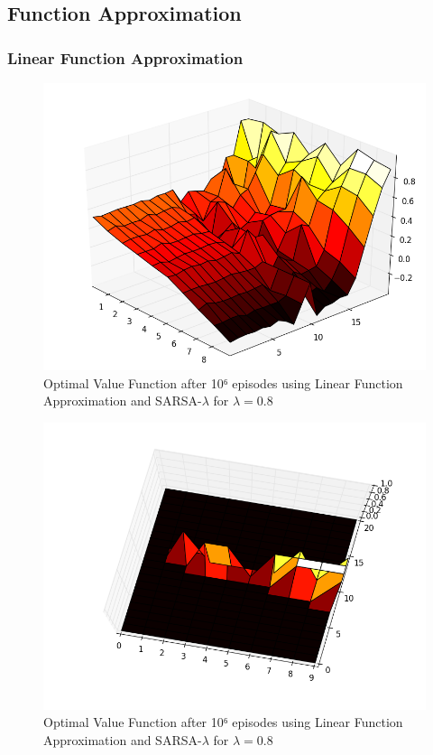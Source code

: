 \documentclass[12pt,a4paper]{article}
\begin{document}
\subsection{Function Approximation}

\subsubsection{Linear Function Approximation}

\begin{figure}[!ht]
   \caption{\label{E21_SL_LA_V} Optimal Value Function after 10⁶ episodes using Linear Function Approximation and SARSA-$\lambda$ for $\lambda=0.8$}
   \includegraphics[scale=0.5]{Easy21_Results/Sarsa_0_8_linear_app_value_1e6.png}
\end{figure}

\begin{figure}[!ht]
   \caption{\label{E21_SL_LA_D} Optimal Value Function after 10⁶ episodes using Linear Function Approximation and SARSA-$\lambda$ for $\lambda=0.8$}
   \includegraphics[scale=0.5]{Easy21_Results/Sarsa_0_8_linear_app_decision_1e6.png}
\end{figure}
\end{document}
